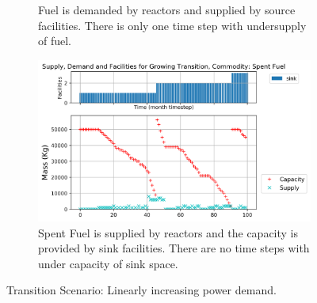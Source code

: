 \begin{figure}[]
\begin{subfigure}[t]{0.6\textwidth}
        \caption{Fuel is demanded by reactors and supplied by source facilities.
        There is only one time step with undersupply of fuel.}
	    \label{fig:growingtransition-fuel}
    \end{subfigure}
    \begin{subfigure}[t]{0.6\textwidth}
        \centering
        \includegraphics[width=\linewidth]{figures/growingtransition-spentfuel.png} 
        \caption{Spent Fuel is supplied by reactors and the capacity is provided by sink facilities.
        There are no time steps with under capacity of sink space.}
        \label{fig:growingtransition-spentfuel}
    \end{subfigure}
    \caption{Transition Scenario: Linearly increasing power demand.}
\end{figure}
